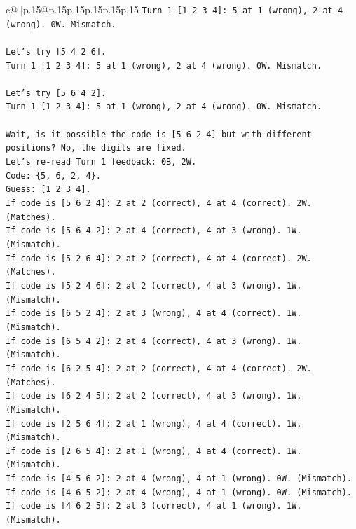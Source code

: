 \documentclass{article}
\begin{document}
{\begin{supertabular}{c@{$\;$}|p{.15\linewidth}@{}p{.15\linewidth}p{.15\linewidth}p{.15\linewidth}p{.15\linewidth}p{.15\linewidth}}
{{{\texttt{Turn 1 {[}1 2 3 4{]}: 5 at 1 (wrong), 2 at 4 (wrong). 0W. Mismatch.} \\
\\ 
\texttt{Let's try {[}5 4 2 6{]}.} \\
\texttt{Turn 1 {[}1 2 3 4{]}: 5 at 1 (wrong), 2 at 4 (wrong). 0W. Mismatch.} \\
\\ 
\texttt{Let's try {[}5 6 4 2{]}.} \\
\texttt{Turn 1 {[}1 2 3 4{]}: 5 at 1 (wrong), 2 at 4 (wrong). 0W. Mismatch.} \\
\\ 
\texttt{Wait, is it possible the code is {[}5 6 2 4{]} but with different positions? No, the digits are fixed.} \\
\texttt{Let's re{-}read Turn 1 feedback: 0B, 2W.} \\
\texttt{Code: \{5, 6, 2, 4\}.} \\
\texttt{Guess: {[}1 2 3 4{]}.} \\
\texttt{If code is {[}5 6 2 4{]}: 2 at 2 (correct), 4 at 4 (correct). 2W. (Matches).} \\
\texttt{If code is {[}5 6 4 2{]}: 2 at 4 (correct), 4 at 3 (wrong). 1W. (Mismatch).} \\
\texttt{If code is {[}5 2 6 4{]}: 2 at 2 (correct), 4 at 4 (correct). 2W. (Matches).} \\
\texttt{If code is {[}5 2 4 6{]}: 2 at 2 (correct), 4 at 3 (wrong). 1W. (Mismatch).} \\
\texttt{If code is {[}6 5 2 4{]}: 2 at 3 (wrong), 4 at 4 (correct). 1W. (Mismatch).} \\
\texttt{If code is {[}6 5 4 2{]}: 2 at 4 (correct), 4 at 3 (wrong). 1W. (Mismatch).} \\
\texttt{If code is {[}6 2 5 4{]}: 2 at 2 (correct), 4 at 4 (correct). 2W. (Matches).} \\
\texttt{If code is {[}6 2 4 5{]}: 2 at 2 (correct), 4 at 3 (wrong). 1W. (Mismatch).} \\
\texttt{If code is {[}2 5 6 4{]}: 2 at 1 (wrong), 4 at 4 (correct). 1W. (Mismatch).} \\
\texttt{If code is {[}2 6 5 4{]}: 2 at 1 (wrong), 4 at 4 (correct). 1W. (Mismatch).} \\
\texttt{If code is {[}4 5 6 2{]}: 2 at 4 (wrong), 4 at 1 (wrong). 0W. (Mismatch).} \\
\texttt{If code is {[}4 6 5 2{]}: 2 at 4 (wrong), 4 at 1 (wrong). 0W. (Mismatch).} \\
\texttt{If code is {[}4 6 2 5{]}: 2 at 3 (correct), 4 at 1 (wrong). 1W. (Mismatch).} \\
}}}
\end{supertabular}}
\end{document}
